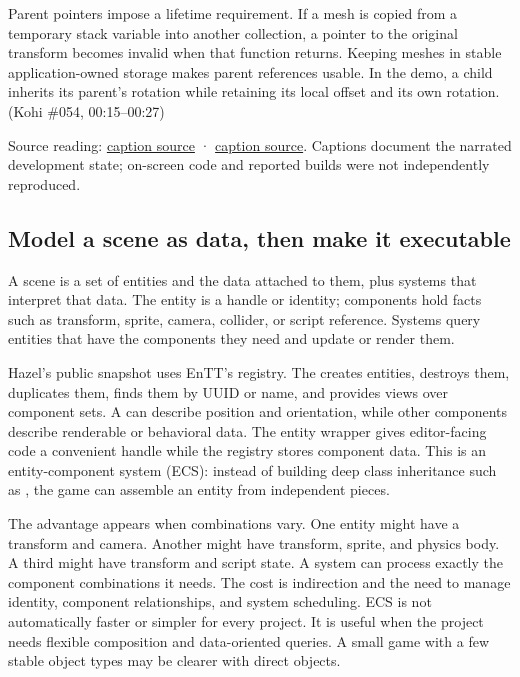 Parent pointers impose a lifetime requirement. If a mesh is copied from a temporary stack variable into another collection, a pointer to the original transform becomes invalid when that function returns. Keeping meshes in stable application-owned storage makes parent references usable. In the demo, a child inherits its parent's rotation while retaining its local offset and its own rotation. (Kohi \#054, 00:15--00:27)

Source reading: \href{https://www.youtube.com/watch?v=73KBx90cD0M}{caption source} · \href{https://www.youtube.com/watch?v=r2535XLneiI}{caption source}. Captions document the narrated development state; on-screen code and reported builds were not independently reproduced.

\subsection{Model a scene as data, then make it executable}\label{06-engine-ii-ch031-model-a-scene-as-data-then-make-it-executable}

\hypertarget{06-engine-ii-ch031-model-a-scene-as-data-then-make-it-executable}{}

A scene is a set of entities and the data attached to them, plus systems that interpret that data. The entity is a handle or identity; components hold facts such as transform, sprite, camera, collider, or script reference. Systems query entities that have the components they need and update or render them.

Hazel's public snapshot uses EnTT's registry. The  creates entities, destroys them, duplicates them, finds them by UUID or name, and provides views over component sets. A  can describe position and orientation, while other components describe renderable or behavioral data. The entity wrapper gives editor-facing code a convenient handle while the registry stores component data. This is an entity-component system (ECS): instead of building deep class inheritance such as , the game can assemble an entity from independent pieces.

The advantage appears when combinations vary. One entity might have a transform and camera. Another might have transform, sprite, and physics body. A third might have transform and script state. A system can process exactly the component combinations it needs. The cost is indirection and the need to manage identity, component relationships, and system scheduling. ECS is not automatically faster or simpler for every project. It is useful when the project needs flexible composition and data-oriented queries. A small game with a few stable object types may be clearer with direct objects.

